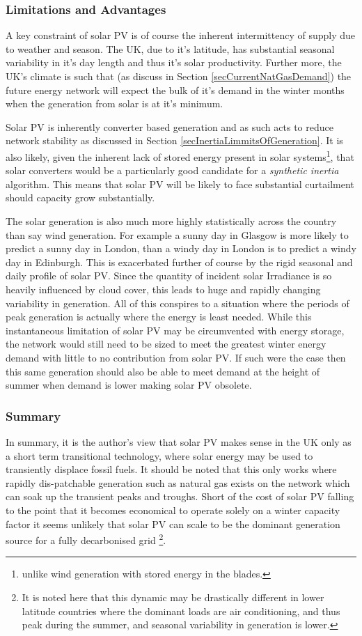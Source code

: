 \documentclass[11pt]{article}
\numberwithin{equation}{section}
\begin{document}
\subsubsection{Limitations and Advantages}
\label{sec:orgbb3a66c}
A key constraint of solar PV is of course the inherent intermittency of supply due to weather and season. The UK, due to it's latitude, has substantial seasonal variability in it's day length and thus it's solar productivity. Further more, the UK's climate is such that (as discuss in Section \ref{secCurrentNatGasDemand}) the future energy network will expect the bulk of it's demand in the winter months when the generation from solar is at it's minimum.

Solar PV is inherently converter based generation and as such acts to reduce network stability as discussed in Section \ref{secInertiaLimmitsOfGeneration}. It is also likely, given the inherent lack of stored energy present in solar systems\footnote{unlike wind generation with stored energy in the blades.}, that solar converters would be a particularly good candidate for a \emph{synthetic inertia} algorithm. This means that solar PV will be likely to face substantial curtailment should capacity grow substantially.

The solar generation is also much more highly statistically across the country than say wind generation. For example a sunny day in Glasgow is more likely to predict a sunny day in London, than a windy day in London is to predict a windy day in Edinburgh. This is exacerbated further of course by the rigid seasonal and daily profile of solar PV. Since the quantity of incident solar Irradiance is so heavily influenced by cloud cover, this leads to huge and rapidly changing variability in generation. All of this conspires to a situation where the periods of peak generation is actually where the energy is least needed. While this instantaneous limitation of solar PV may be circumvented with energy storage, the network would still need to be sized to meet the greatest winter energy demand with little to no contribution from solar PV. If such were the case then this same generation should also be able to meet demand at the height of summer when demand is lower making solar PV obsolete.

\subsubsection{Summary}
\label{sec:org16afc7e}
In summary, it is the author's view that solar PV makes sense in the UK only as a short term transitional technology, where solar energy may be used to transiently displace fossil fuels. It should be noted that this only works where rapidly dis-patchable generation such as natural gas exists on the network which can soak up the transient peaks and troughs.  Short of the cost of solar PV falling to the point that it becomes economical to operate solely on a winter capacity factor it seems unlikely that solar PV can scale to be the dominant generation source for a fully decarbonised grid \footnote{It is noted here that this dynamic may be drastically different in lower latitude countries where the dominant loads are air conditioning, and thus peak during the summer, and seasonal variability in generation is lower.}.
\end{document}
